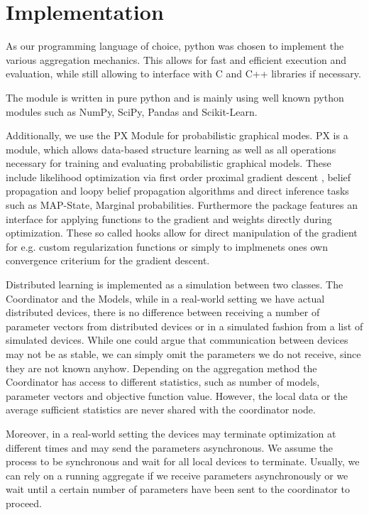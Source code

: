 
\chapter{Implementation}
\label{chapter:ch4}
As our programming language of choice, python was chosen to implement the various aggregation mechanics. 
This allows for fast and efficient execution and evaluation, while still allowing to interface with C and C++  libraries if necessary.

The module is written in pure python and is mainly using well known python modules such as NumPy, SciPy, Pandas and Scikit-Learn.

Additionally, we use the PX Module for probabilistic graphical modes.
PX is a module, which allows data-based structure learning as well as all operations necessary for training and evaluating probabilistic graphical models. 
These include likelihood optimization via first order proximal gradient descent \cite{piatkowski2018exponential}, belief propagation and loopy belief propagation algorithms and direct inference tasks such as MAP-State, Marginal probabilities.
Furthermore the package features an interface for applying functions to the gradient and weights directly during optimization.
These so called hooks allow for direct manipulation of the gradient for e.g. custom regularization functions or simply to implmenets ones own convergence criterium for the gradient descent.

Distributed learning is implemented as a simulation between two classes. The Coordinator and the Models, while in a real-world setting we have actual distributed devices, there is no difference between receiving a number of parameter vectors from distributed devices or in a simulated fashion from a list of simulated devices.
While one could argue that communication between devices may not be as stable, we can simply omit the parameters we do not receive, since they are not known anyhow.
Depending on the aggregation method the Coordinator has access to different statistics, such as number of models, parameter vectors and objective function value. 
However, the local data or the average sufficient statistics are never shared with the coordinator node.

Moreover, in a real-world setting the devices may terminate optimization at different times and may send the parameters asynchronous. 
We assume the process to be synchronous and wait for all local devices to terminate.
Usually, we can rely on a running aggregate if we receive parameters asynchronously or we wait until a certain number of parameters have been sent to the coordinator to proceed.



